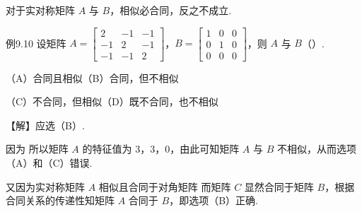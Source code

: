 
对于实对称矩阵 $A$ 与 $B$，相似必合同，反之不成立.

\begin{fcard}{例9.10}
设矩阵 $A=\begin{bmatrix}2&-1&-1\\-1&2&-1\\-1&-1&2\end{bmatrix}$，$B=\begin{bmatrix}1&0&0\\0&1&0\\0&0&0\end{bmatrix}$，则 $A$ 与 $B$（\quad）.

（A）合同且相似\qquad（B）合同，但不相似

（C）不合同，但相似\qquad（D）既不合同，也不相似

【解】应选（B）.

因为
所以矩阵 $A$ 的特征值为 $3$，$3$，$0$，由此可知矩阵 $A$ 与 $B$ 不相似，从而选项（A）和（C）错误.

又因为实对称矩阵 $A$ 相似且合同于对角矩阵
而矩阵 $C$ 显然合同于矩阵 $B$，根据合同关系的传递性知矩阵 $A$ 合同于 $B$，即选项（B）正确.
\end{fcard}

